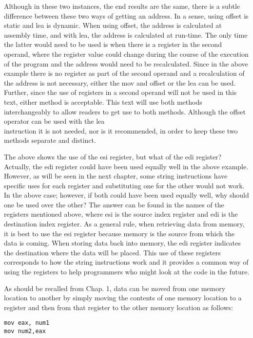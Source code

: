\documentclass[10pt]{article}
\begin{document}
Although in these two instances, the end results are the same, there is a subtle difference between these two ways of getting an address. In a sense, using offset is static and lea is dynamic. When using offset, the address is calculated at assembly time, and with lea, the address is calculated at run-time. The only time the latter would need to be used is when there is a register in the second operand, where the register value could change during the course of the execution of the program and the address would need to be recalculated. Since in the above example there is no register as part of the second operand and a recalculation of the address is not necessary, either the mov and offset or the lea can be used. Further, since the use of registers in a second operand will not be used in this text, either method is acceptable. This text will use both methods interchangeably to allow readers to get use to both methods. Although the offset operator can be used with the lea\\
instruction it is not needed, nor is it recommended, in order to keep these two methods separate and distinct.

The above shows the use of the esi register, but what of the edi register? Actually, the edi register could have been used equally well in the above example. However, as will be seen in the next chapter, some string instructions have specific uses for each register and substituting one for the other would not work. In the above case; however, if both could have been used equally well, why should one be used over the other? The answer can be found in the names of the registers mentioned above, where esi is the source index register and edi is the destination index register. As a general rule, when retrieving data from memory, it is best to use the esi register because memory is the source from which the data is coming. When storing data back into memory, the edi register indicates the destination where the data will be placed. This use of these registers corresponds to how the string instructions work and it provides a common way of using the registers to help programmers who might look at the code in the future.

As should be recalled from Chap. 1, data can be moved from one memory location to another by simply moving the contents of one memory location to a register and then from that register to the other memory location as follows:

\begin{verbatim}
mov eax, num1
mov num2,eax
\end{verbatim}
\end{document}
